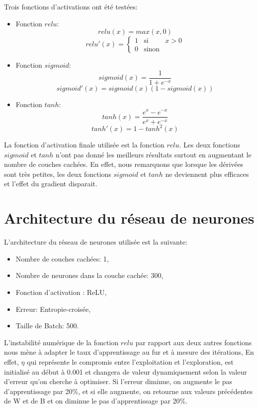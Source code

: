 \documentclass[a4paper,english,12pt]{article}
\begin{document}
Trois fonctions d'activations ont été testées:

\begin{itemize}
	\item Fonction $relu$:	
		$$relu(x)=max(x,0)$$		
		\begin{equation}
		relu'(x) = \left\{ \begin{array}{rcl}
		{1} & \mbox{si}
		& x>0 \\ 0 & \mbox{sinon}
		\end{array}\right.\label{eq2}
		\end{equation}
	\item Fonction $sigmoid$:
		$$ sigmoid(x) = \frac{1}{1 + e^{-x}}$$
		$$sigmoid'(x)=sigmoid(x)(1-sigmoid(x))$$
	\item  Fonction $tanh$:	
		$$ tanh(x) = \frac{e^{x} - e^{-x}}{e^{x} + e^{-x}}$$
		$$ tanh'(x)=1-tanh^2(x)$$
\end{itemize}

La fonction d'activation finale utilisée est la fonction $relu$. Les deux fonctions $sigmoid$ et $tanh$ n'ont pas donné les meilleurs résultats surtout en augmentant le nombre de couches cachées. En effet, nous remarquons que lorsque les dérivées sont très petites, les deux fonctions $sigmoid$ et $tanh$ ne deviennent plus efficaces et l'effet du gradient disparait. 

\section{Architecture du réseau de neurones}
L'architecture du réseau de neurones utilisée est la suivante: 
\begin{itemize}
	\item Nombre de couches cachées: 1,
	\item Nombre de neurones dans la couche cachée: 300,
	\item Fonction d'activation : ReLU,
	\item Erreur: Entropie-croisée,
	\item Taille de Batch: 500.
\end{itemize}

L'instabilité numérique de la fonction $relu$ par rapport aux deux autres fonctions nous mène à adapter le taux d'apprentissage au fur et à mesure des itérations, En effet, $\eta$ qui représente le compromis entre l'exploitation et l'exploration, est initialisé au début à 0.001 et changera de valeur dynamiquement selon la valeur d'erreur qu'on cherche à optimiser. Si l'erreur diminue, on augmente le pas d'apprentissage par 20\%, et si elle augmente, on retourne aux valeurs précédentes de W et de B et on diminue le pas d'apprentissage par 20\%.
\end{document}
